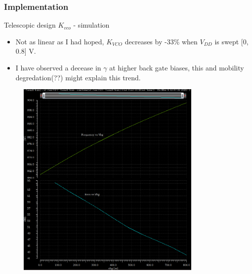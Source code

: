 \documentclass[t, screen, aspectratio=43]{beamer}
\begin{document}
\begin{frame}
	\frametitle{Implementation}
	\begin{block}{Telescopic design $K_{vco}$ - simulation}
				\vspace{2em}
		\begin{minipage}{6cm}
			\tiny


			\begin{itemize}[itemsep=4pt,label=\protect---]
				\item Not as linear as I had hoped, $K_{VCO}$ decreases by -33\% when $V_{DD}$ is swept [0, 0.8] V.
				\item I have observed a decease in $\gamma$ at higher back gate biases, this and mobility degredation(??) might explain this trend.
			\end{itemize}
		\end{minipage}%
		\begin{minipage}{6cm}
			\begin{figure}[htb!]
			        \centering
			        \includegraphics[width=0.8\textwidth, angle=0]{telescopic_kcvo_vbg}
			\end{figure}

		\end{minipage}%

	\end{block}	
\end{frame}
\end{document}
